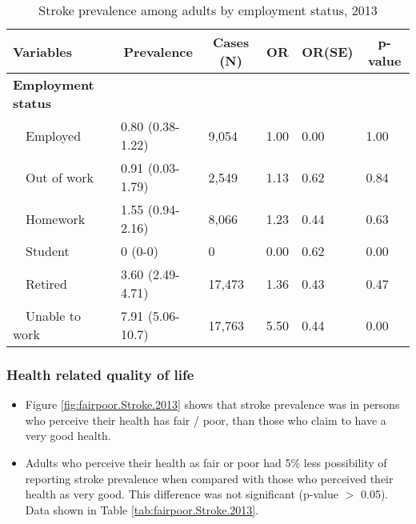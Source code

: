 \begin{table}[H]
\caption{Stroke prevalence  among adults by employment status, 2013\label{tab:employ.Stroke.2013}} 
\begin{center}
\begin{tabular}{llllll}
\hline\hline
\multicolumn{1}{l}{Variables}&\multicolumn{1}{c}{Prevalence}&\multicolumn{1}{c}{Cases (N)}&\multicolumn{1}{c}{OR}&\multicolumn{1}{c}{OR(SE)}&\multicolumn{1}{c}{p-value}\tabularnewline
\hline
{\bfseries Employment status}&&&&&\tabularnewline
~~Employed&0.80 (0.38-1.22)& 9,054&1.00&0.00&1.00\tabularnewline
~~Out of work&0.91 (0.03-1.79)& 2,549&1.13&0.62&0.84\tabularnewline
~~Homework&1.55 (0.94-2.16)& 8,066&1.23&0.44&0.63\tabularnewline
~~Student&0 (0-0)&     0&0.00&0.62&0.00\tabularnewline
~~Retired&3.60 (2.49-4.71)&17,473&1.36&0.43&0.47\tabularnewline
~~Unable to work&7.91 (5.06-10.7)&17,763&5.50&0.44&0.00\tabularnewline
\hline
\end{tabular}\end{center}

\end{table}


 \newpage
\subsubsection{Health related quality of life}


 \begin{itemize}

\item Figure \ref{fig:fairpoor.Stroke.2013} shows that stroke prevalence  was 
 in persons who perceive their health has fair / poor,
than those who claim to have a very good health.

\item Adults who perceive their health as fair or poor had 5\% less possibility of reporting stroke prevalence when compared with those who perceived their health as very good. This difference was not significant (p-value $>$ 0.05). Data shown in Table \ref{tab:fairpoor.Stroke.2013}.

\end{itemize}

